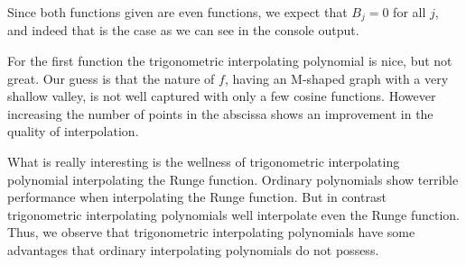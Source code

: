 \documentclass{article}
\begin{document}
Since both functions given are even functions, we expect that $B_j =0$ for all $j$, and indeed that is the case as we can see in the console output. \par 
For the first function the trigonometric interpolating polynomial is nice, but not great. Our guess is that the nature of $f$, having an M-shaped graph with a very shallow valley, is not well captured with only a few cosine functions. However increasing the number of points in the abscissa shows an improvement in the quality of interpolation. \par 
What is really interesting is the wellness of trigonometric interpolating polynomial interpolating the Runge function. Ordinary polynomials show terrible performance when interpolating the Runge function. But in contrast trigonometric interpolating polynomials well interpolate even the Runge function. Thus, we observe that trigonometric interpolating polynomials have some advantages that ordinary interpolating polynomials do not possess. 
\end{document}
